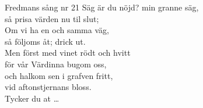 \begin{song}{Fredmans sång nr 21}
	\showversenumber
	Säg är du nöjd? min granne säg,\\
	så prisa värden nu til slut;\\
	Om vi ha en och samma väg,\\
	så följoms åt; drick ut.\\
	Men först med vinet rödt och hvitt\\
	för vår Värdinna bugom oss,\\
	och halkom sen i grafven fritt,\\
	vid aftonstjernans bloss.\\
	Tycker du at \ldots{}


%	
%	
%	
%	

\end{song}
